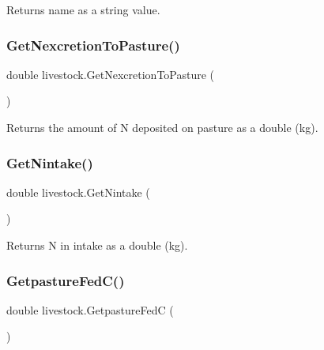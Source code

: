 Returns name as a string value. 

\mbox{\label{classlivestock_a979d4fdafd3d30bd6047d3d27a1020e5}} 
\subsubsection{\texorpdfstring{GetNexcretionToPasture()}{GetNexcretionToPasture()}}
{\footnotesize\ttfamily double livestock.\+Get\+Nexcretion\+To\+Pasture (\begin{DoxyParamCaption}{ }\end{DoxyParamCaption})\hspace{0.3cm}{\ttfamily [inline]}}



Returns the amount of N deposited on pasture as a double (kg). 

\mbox{\label{classlivestock_ae354b6d283542c620c13c26d56885ceb}} 
\subsubsection{\texorpdfstring{GetNintake()}{GetNintake()}}
{\footnotesize\ttfamily double livestock.\+Get\+Nintake (\begin{DoxyParamCaption}{ }\end{DoxyParamCaption})\hspace{0.3cm}{\ttfamily [inline]}}



Returns N in intake as a double (kg). 

\mbox{\label{classlivestock_a88259956eaef4d65f5ae738d12101c51}} 
\subsubsection{\texorpdfstring{GetpastureFedC()}{GetpastureFedC()}}
{\footnotesize\ttfamily double livestock.\+Getpasture\+FedC (\begin{DoxyParamCaption}{ }\end{DoxyParamCaption})\hspace{0.3cm}{\ttfamily [inline]}}



